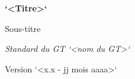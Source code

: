\begin{titlepage}
    {\Large\bfseries `<Titre>` \par}

    \vspace{0.5cm}

    {\Large Sous-titre \par}  %

    \vfill

    {\Large\itshape Standard du GT `<nom du GT>` \par}    %
    \vspace{0.5cm}
    {\large Version `<x.x - jj mois aaaa>` \par}    %

\end{titlepage}

\newpage
\thispagestyle{empty}       %
\mbox{}
\newpage

